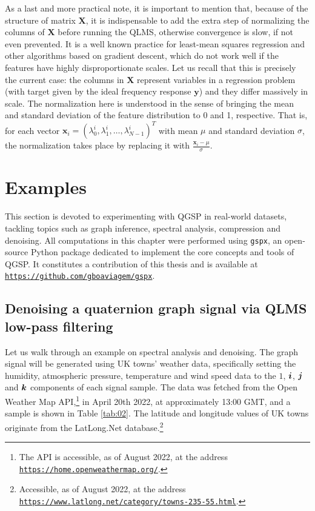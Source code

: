 As a last and more practical note, it is important to mention that, because of the structure of matrix $\mathbf{X}$, it is indispensable to add the extra step of normalizing the columns of $\mathbf{X}$ before running the QLMS, otherwise convergence is slow, if not even prevented. It is a well known practice for least-mean squares regression and other algorithms based on gradient descent, which do not work well if the features have highly disproportionate scales. Let us recall that this is precisely the current case: the columns in $\mathbf{X}$ represent variables in a regression problem (with target given by the ideal frequency response $\mathbf{y}$) and they differ massively in scale. The normalization here is understood in the sense of bringing the mean and standard deviation of the feature distribution to 0 and 1, respective. That is, for each vector $\mathbf{x}_i = (\lambda^i_0, \lambda^i_1, \dots, \lambda^i_{N-1})^T$ with mean $\mu$ and standard deviation $\sigma$, the normalization takes place by replacing it with $\frac{\mathbf{x}_i - \mu}{\sigma}$.

\section{Examples}

This section is devoted to experimenting with QGSP in real-world datasets, tackling topics such as graph inference, spectral analysis, compression and denoising. All computations in this chapter were performed using \texttt{gspx}, an open-source Python package dedicated to implement the core concepts and tools of QGSP. It constitutes a contribution of this thesis and is available at \texttt{\url{https://github.com/gboaviagem/gspx}}.

\subsection{Denoising a quaternion graph signal via QLMS low-pass filtering}
\label{subsec:denoising}

Let us walk through an example on spectral analysis and denoising. The graph signal will be generated using UK towns' weather data, specifically setting the humidity, atmospheric pressure, temperature and wind speed data to the $1$, $\boldsymbol{i}$, $\boldsymbol{j}$ and $\boldsymbol{k}$ components of each signal sample. The data was fetched from the Open Weather Map API,\footnote{The API is accessible, as of August 2022, at the address \texttt{\url{https://home.openweathermap.org/}}.} in April 20th 2022, at approximately 13:00 GMT, and a sample is shown in Table \ref{tab:02}. The latitude and longitude values of UK towns originate from the LatLong.Net database.\footnote{Accessible, as of August 2022, at the address \texttt{\url{https://www.latlong.net/category/towns-235-55.html}}.}

